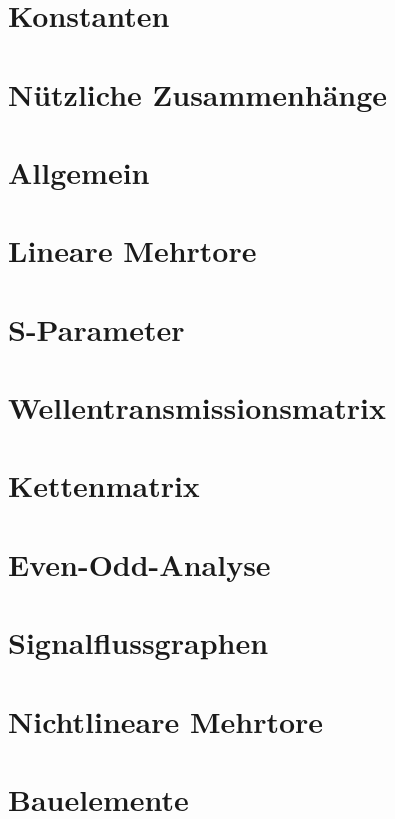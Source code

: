 \documentclass[
	DIV=calc,
	fontsize=7pt,
	paper=A4,
	pagesize,
	twocolumn
	]{scrartcl}
\begin{document}
\section*{Konstanten}


\section*{Nützliche Zusammenhänge}


\section*{Allgemein}


\section*{Lineare Mehrtore}


\section*{S-Parameter}


\section*{Wellentransmissionsmatrix}


\section*{Kettenmatrix}


\section*{Even-Odd-Analyse}


\section*{Signalflussgraphen}


\section*{Nichtlineare Mehrtore}


\section*{Bauelemente}

\end{document}
